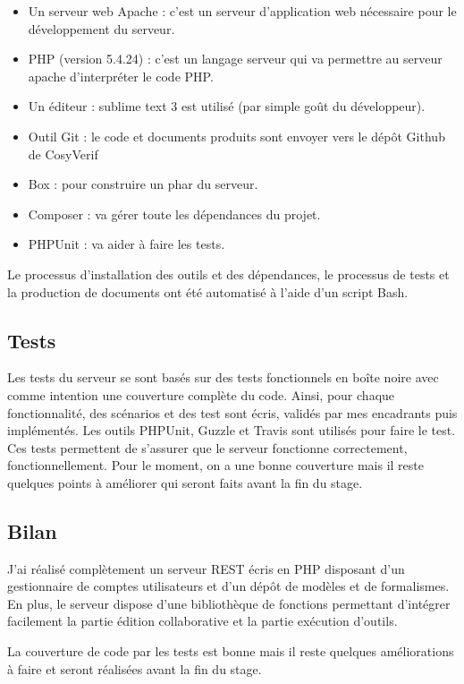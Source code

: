 \documentclass{report}
\begin{document}
\begin{itemize}
\item  Un serveur web Apache : c'est un serveur d'application web nécessaire pour le développement 
du serveur.
\item PHP (version 5.4.24) : c'est un langage serveur qui va permettre au serveur apache d'interpréter le code PHP.
\item Un éditeur : sublime text 3 est utilisé (par simple goût du développeur).
\item Outil Git : le code et documents produits sont envoyer vers le dépôt Github de CosyVerif %
\item Box : pour construire un phar du serveur.
\item Composer : va gérer toute les dépendances du projet.
\item PHPUnit : va aider à faire les tests.
\end{itemize}

Le processus d'installation des outils et des dépendances, le processus de tests et la production de documents ont été  automatisé à l'aide d'un script Bash.


\subsection{Tests}

Les tests du serveur se sont basés sur des tests fonctionnels en boîte noire avec comme
intention une couverture complète du code. Ainsi, pour chaque
fonctionnalité, des scénarios et des test sont écris, validés par mes encadrants puis implémentés. Les outils 
PHPUnit, Guzzle et Travis sont utilisés pour faire le test. Ces tests permettent de s'assurer que le serveur 
fonctionne correctement, fonctionnellement. Pour le moment, on a une bonne couverture mais il reste quelques
points à améliorer qui seront faits avant la fin du stage.

\subsection{Bilan}

J'ai réalisé complètement un serveur REST écris en PHP disposant d'un gestionnaire de comptes utilisateurs et d'un 
dépôt de modèles et de formalismes. En plus, le serveur dispose d'une bibliothèque de fonctions permettant 
d'intégrer facilement la partie édition collaborative et la partie exécution d'outils. 

La couverture de code par les tests est bonne mais il reste quelques améliorations à faire et seront réalisées avant la
fin du stage.
\end{document}
